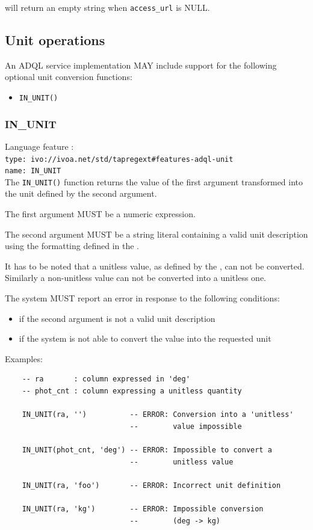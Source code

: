 \documentclass[11pt,a4paper]{ivoa}
\begin{document}
\noindent will return an empty string when \verb|access_url| is NULL.


\subsection{Unit operations}
\label{sec:unit}

An ADQL service implementation MAY include support for the following optional
unit conversion functions:

\begin{itemize}
    \item \verb:IN_UNIT():
\end{itemize}

\subsubsection{IN\_UNIT}
\label{sec:unit.in_unit}
{\footnotesize Language feature :}\\
{\footnotesize \verb|type: ivo://ivoa.net/std/tapregext#features-adql-unit|}\\
{\footnotesize \verb|name: IN_UNIT|}\\

The \verb:IN_UNIT(): function returns the value of the first argument
transformed into the unit defined by the second argument.

The first argument MUST be a numeric expression.

The second argument MUST be a string literal containing a valid unit
description using the formatting defined in the \VOUnitSpec{}.

It has to be noted that a unitless value, as defined by the \VOUnitSpec{}, can not
be converted. Similarly a non-unitless value can not be converted into a
unitless one.

The system MUST report an error in response to the following conditions:
\begin{itemize}
    \item if the second argument is not a valid unit description
    \item if the system is not able to convert the value into the requested unit
\end{itemize}

Examples:

\begin{verbatim}
    -- ra       : column expressed in 'deg'
    -- phot_cnt : column expressing a unitless quantity

    IN_UNIT(ra, '')          -- ERROR: Conversion into a 'unitless'
                             --        value impossible

    IN_UNIT(phot_cnt, 'deg') -- ERROR: Impossible to convert a
                             --        unitless value

    IN_UNIT(ra, 'foo')       -- ERROR: Incorrect unit definition

    IN_UNIT(ra, 'kg')        -- ERROR: Impossible conversion
                             --        (deg -> kg)
\end{verbatim}
\end{document}
